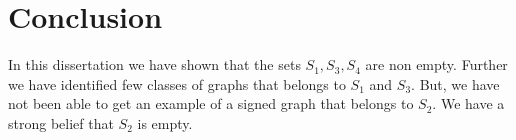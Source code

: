 % 
% 
% 
%  

\section{Conclusion}
In this dissertation we have shown that the sets $S_1,S_3,S_4$ are non empty. Further we have identified few classes of graphs 
that belongs to $S_1$ and $S_3$. But, we have not been able to get an example of a signed graph that belongs to $S_2$. We have a 
strong belief that $S_2$ is empty. 